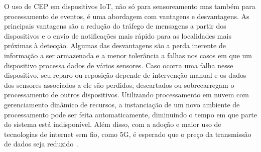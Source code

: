 O uso de CEP em dispositivos IoT, não só para sensoreamento mas também para processamento de eventos, é uma abordagem com vantagens e desvantagens. As principais vantagens são a redução do tráfego de mensagens a partir dos dispositivos e o envio de notificações mais rápido para as localidades mais próximas à detecção. Algumas das desvantagens são a perda inerente de informação a ser armazenada e a menor tolerância a falhas nos casos em que um dispositivo processa dados de vários sensores. Caso ocorra uma falha nesse dispositivo, seu reparo ou reposição depende de intervenção manual e os dados dos sensores associados a ele são perdidos, descartados ou sobrecarregam o processamento de outros dispositivos. Utilizando processamento em nuvem com gerenciamento dinâmico de recursos, a instanciação de um novo ambiente de processamento pode ser feita automaticamente, diminuindo o tempo em que parte do sistema está indisponível. Além disso, com a adoção e maior uso de tecnologias de internet sem fio, como 5G, é esperado que o preço da transmissão de dados seja reduzido~\citep{maeng2020demand,8480631}. 













